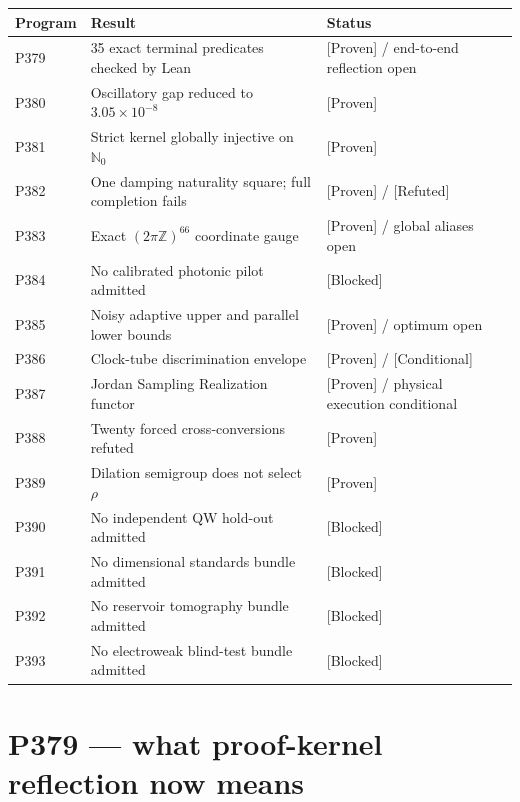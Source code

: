 \documentclass[11pt,a4paper,openany]{report}
\newcommand{\statusProven}{\textcolor{fingreen}{[Proven]}}
\newcommand{\statusRefuted}{\textcolor{finred}{[Refuted]}}
\begin{document}
\begin{center}
\begingroup\small
\setlength{\tabcolsep}{2.5pt}
\renewcommand{\arraystretch}{1.16}
\begin{longtable}{@{}p{}p{}p{}@{}}
\toprule
\textbf{Program} & \textbf{Result} & \textbf{Status} \\
\midrule
\endhead
P379 & 35 exact terminal predicates checked by Lean & \statusProven{} /\allowbreak{} end-to-end reflection open \\
P380 & Oscillatory gap reduced to \(3.05\times10^{-8}\) & \statusProven{} \\
P381 & Strict kernel globally injective on \(\mathbb N_0\) & \statusProven{} \\
P382 & One damping naturality square; full completion fails & \statusProven{} /\allowbreak{} \statusRefuted{} \\
P383 & Exact \((2\pi\mathbb Z)^{66}\) coordinate gauge & \statusProven{} /\allowbreak{} global aliases open \\
P384 & No calibrated photonic pilot admitted & [Blocked] \\
P385 & Noisy adaptive upper and parallel lower bounds & \statusProven{} /\allowbreak{} optimum open \\
P386 & Clock-tube discrimination envelope & \statusProven{} /\allowbreak{} [Conditional] \\
P387 & Jordan Sampling Realization functor & \statusProven{} /\allowbreak{} physical execution conditional \\
P388 & Twenty forced cross-conversions refuted & \statusProven{} \\
P389 & Dilation semigroup does not select \(\rho\) & \statusProven{} \\
P390 & No independent QW hold-out admitted & [Blocked] \\
P391 & No dimensional standards bundle admitted & [Blocked] \\
P392 & No reservoir tomography bundle admitted & [Blocked] \\
P393 & No electroweak blind-test bundle admitted & [Blocked] \\
\bottomrule
\end{longtable}
\endgroup
\end{center}

\chapter{P379 --- what proof-kernel reflection now means}
\end{document}
